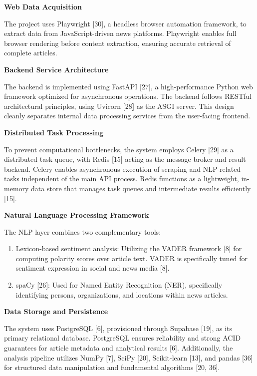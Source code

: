 \textbf{Web Data Acquisition}

The project uses Playwright {[}30{]}, a headless browser automation framework, to extract data from JavaScript-driven news platforms. Playwright enables full browser rendering before content extraction, ensuring accurate retrieval of complete articles.

\textbf{Backend Service Architecture}

The backend is implemented using FastAPI {[}27{]}, a high-performance Python web framework optimized for asynchronous operations. The backend follows RESTful architectural principles, using Uvicorn {[}28\textbf{{]}} as the ASGI server. This design cleanly separates internal data processing services from the user-facing frontend.

\textbf{Distributed Task Processing}

To prevent computational bottlenecks, the system employs Celery {[}29{]} as a distributed task queue, with Redis {[}15{]} acting as the message broker and result backend. Celery enables asynchronous execution of scraping and NLP-related tasks independent of the main API process. Redis functions as a lightweight, in-memory data store that manages task queues and intermediate results efficiently {[}15{]}.

\textbf{Natural Language Processing Framework}

The NLP layer combines two complementary tools:

\begin{enumerate}
\def\labelenumi{\arabic{enumi}.}
\item
  Lexicon-based sentiment analysis: Utilizing the VADER framework {[}8{]} for computing polarity scores over article text. VADER is specifically tuned for sentiment expression in social and news media {[}8{]}.
\item
  spaCy {[}26{]}: Used for Named Entity Recognition (NER), specifically identifying persons, organizations, and locations within news articles.
\end{enumerate}

\textbf{Data Storage and Persistence}

The system uses PostgreSQL {[}6{]}, provisioned through Supabase {[}19{]}, as its primary relational database. PostgreSQL ensures reliability and strong ACID guarantees for article metadata and analytical results {[}6{]}. Additionally, the analysis pipeline utilizes NumPy {[}7{]}, SciPy {[}20{]}, Scikit-learn {[}13{]}, and pandas {[}36{]} for structured data manipulation and fundamental algorithms {[}20, 36{]}.

